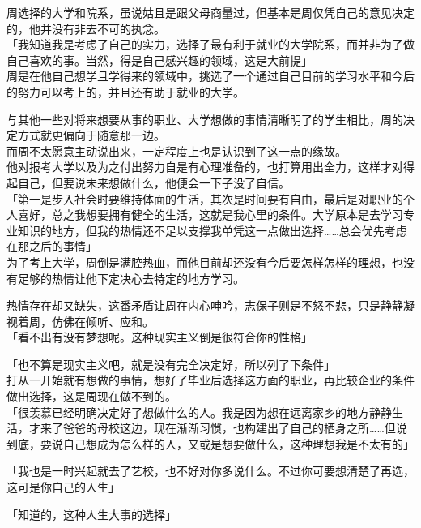 周选择的大学和院系，虽说姑且是跟父母商量过，但基本是周仅凭自己的意见决定的，他并没有非去不可的执念。\\

「我知道我是考虑了自己的实力，选择了最有利于就业的大学院系，而并非为了做自己喜欢的事。当然，得是自己感兴趣的领域，这是大前提」\\

周是在他自己想学且学得来的领域中，挑选了一个通过自己目前的学习水平和今后的努力可以考上的，并且还有助于就业的大学。

与其他一些对将来想要从事的职业、大学想做的事情清晰明了的学生相比，周的决定方式就更偏向于随意那一边。\\

而周不太愿意主动说出来，一定程度上也是认识到了这一点的缘故。\\

他对报考大学以及为之付出努力自是有心理准备的，也打算用出全力，这样才对得起自己，但要说未来想做什么，他便会一下子没了自信。\\

「第一是步入社会时要维持体面的生活，其次是时间要有自由，最后是对职业的个人喜好，总之我想要拥有健全的生活，这就是我心里的条件。大学原本是去学习专业知识的地方，但我的热情还不足以支撑我单凭这一点做出选择……总会优先考虑在那之后的事情」\\

为了考上大学，周倒是满腔热血，而他目前却还没有今后要怎样怎样的理想，也没有足够的热情让他下定决心去特定的地方学习。

热情存在却又缺失，这番矛盾让周在内心呻吟，志保子则是不怒不悲，只是静静凝视着周，仿佛在倾听、应和。\\

「看不出有没有梦想呢。这种现实主义倒是很符合你的性格」

「也不算是现实主义吧，就是没有完全决定好，所以列了下条件」\\

打从一开始就有想做的事情，想好了毕业后选择这方面的职业，再比较企业的条件做出选择，这是周现在做不到的。\\

「很羡慕已经明确决定好了想做什么的人。我是因为想在远离家乡的地方静静生活，才来了爸爸的母校这边，现在渐渐习惯，也构建出了自己的栖身之所……但说到底，要说自己想成为怎么样的人，又或是想要做什么，这种理想我是不太有的」

「我也是一时兴起就去了艺校，也不好对你多说什么。不过你可要想清楚了再选，这可是你自己的人生」

「知道的，这种人生大事的选择」\\

